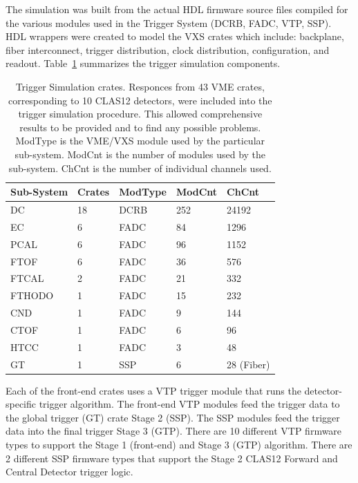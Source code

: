 The simulation was built from the actual HDL firmware source files compiled for the various modules used in the Trigger System (DCRB, FADC, VTP, SSP). HDL wrappers were created to model the VXS crates which include: backplane, fiber interconnect, trigger distribution, clock distribution, configuration, and readout. Table~\ref{tab:trig_sim_crates} summarizes the trigger simulation components.

\begin{table}
\begin{center}
	\begin{tabular}{| l | l | l | l | l |}
		\hline \hline
		Sub-System		& Crates	& ModType	& ModCnt	& ChCnt		\\
		\hline
		DC			& 18		& DCRB		& 252		& 24192		\\
		EC		& 6			& FADC		& 84		& 1296	 	\\
		PCAL		& 6			& FADC		& 96		& 1152	 	\\
		FTOF		& 6			& FADC		& 36		& 576	 	\\
		FTCAL		& 2			& FADC		& 21		& 332	 	\\
		FTHODO		& 1			& FADC		& 15		& 232	 	\\
		CND			& 1			& FADC		& 9			& 144	 	\\
		CTOF		& 1			& FADC		& 6			& 96	 	\\
		HTCC		& 1			& FADC		& 3			& 48	 	\\
		GT			& 1			& SSP		& 6			& 28 (Fiber)	\\
		\hline \hline
	\end{tabular}
\end{center}
\caption{Trigger Simulation crates. Responces from 43 VME crates, corresponding to 10 CLAS12 detectors, were included into the trigger simulation procedure. This allowed comprehensive results to be provided and to find any possible problems. ModType is the VME/VXS module used by the particular sub-system. ModCnt is the number of modules used by the sub-system. ChCnt is the number of individual channels used.}
\label{tab:trig_sim_crates}
\end{table}

Each of the front-end crates uses a VTP trigger module that runs the detector-specific trigger algorithm. The front-end VTP modules feed the trigger data to the global trigger (GT) crate Stage 2 (SSP). The SSP modules feed the trigger data into the final trigger Stage 3 (GTP). There are 10 different VTP firmware types to support the Stage 1 (front-end) and Stage 3 (GTP) algorithm. There are 2 different SSP firmware types that support the Stage 2 CLAS12 Forward and Central Detector trigger logic.

